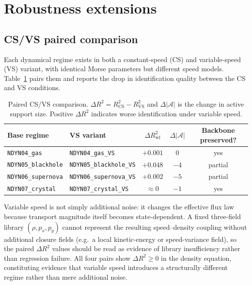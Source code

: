 \section{Robustness extensions}
\label{sec:wsindy_robustness}

\subsection{CS/VS paired comparison}
\label{sec:wsindy_cs_vs_paired}

Each dynamical regime exists in both a constant-speed (CS) and
variable-speed (VS) variant, with identical Morse parameters but
different speed models.  Table~\ref{tab:cs_vs_paired} pairs them and
reports the drop in identification quality between the CS and VS conditions.

\begin{table}[ht]
\centering
\caption{Paired CS/VS comparison.  $\Delta R^2 = R^2_{\text{CS}} - R^2_{\text{VS}}$
and $\Delta|\mathcal{A}|$ is the change in active support size.  Positive
$\Delta R^2$ indicates worse identification under variable speed.}
\label{tab:cs_vs_paired}
\renewcommand{\arraystretch}{0.95}
\small
\begin{tabular}{llccc}
\toprule
\textbf{Base regime} & \textbf{VS variant} & $\Delta R^2_{\text{wf}}$ & $\Delta|\mathcal{A}|$ & Backbone preserved? \\
\midrule
\texttt{NDYN04\_gas} & \texttt{NDYN04\_gas\_VS} & $+0.001$ & $0$ & yes \\
\texttt{NDYN05\_blackhole} & \texttt{NDYN05\_blackhole\_VS} & $+0.048$ & $-4$ & partial \\
\texttt{NDYN06\_supernova} & \texttt{NDYN06\_supernova\_VS} & $+0.002$ & $-5$ & partial \\
\texttt{NDYN07\_crystal} & \texttt{NDYN07\_crystal\_VS} & $\approx 0$ & $-1$ & yes \\
\bottomrule
\end{tabular}
\end{table}

Variable speed is not simply additional noise: it changes the effective
flux law because transport magnitude itself becomes state-dependent.
A fixed three-field library $(\rho, p_x, p_y)$ cannot represent the
resulting speed--density coupling without additional closure fields
(e.g.\ a local kinetic-energy or speed-variance field), so the paired
$\Delta R^2$ values should be read as evidence of library insufficiency
rather than regression failure.  All four pairs show $\Delta R^2 \geq 0$
in the density equation, constituting evidence that variable speed
introduces a structurally different regime rather than mere additional
noise.

